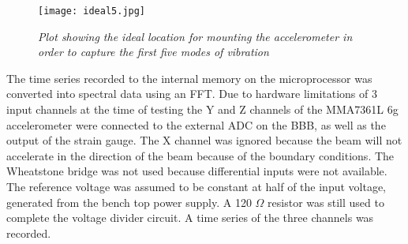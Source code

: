 \begin{figure}[H]
\centering
\texttt{[image: ideal5.jpg]}
\caption{\textit{Plot showing the ideal location for mounting the accelerometer in order to capture the first five modes of vibration}}
\label{fig:DC_AccPlacingIdeal}
\end{figure}
\indent The time series recorded to the internal memory on the microprocessor was converted into spectral data using an FFT. Due to hardware limitations of 3 input channels at the time of testing the Y and Z channels of the MMA7361L 6g accelerometer were connected to the external ADC on the BBB, as well as the output of the strain gauge. The X channel was ignored because the beam will not accelerate in the direction of the beam because of the boundary conditions. The Wheatstone bridge was not used because differential inputs were not available. The reference voltage was assumed to be constant at half of the input voltage, generated from the bench top power supply. A 120 $\Omega$ resistor was still used to complete the voltage divider circuit. A time series of the three channels was recorded. 